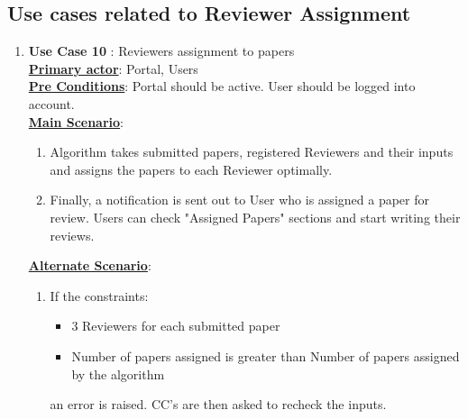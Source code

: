\documentclass[english,a4paper,12pt]{report}
\begin{document}
\subsection{Use cases related to Reviewer Assignment}
\begin{enumerate}
    \item \textbf{Use Case 10 }: Reviewers assignment to papers \\
\underline{\textbf{Primary actor}}: Portal, Users\\
\underline{\textbf{Pre Conditions}}: Portal should be active. User should be logged into account.\\
\underline{\textbf{Main Scenario}}:
\begin{enumerate}
    \item Algorithm takes submitted papers, registered Reviewers and their inputs and assigns the papers to each Reviewer optimally.
    \item Finally, a notification is sent out to User who is assigned a paper for review. Users can check "Assigned Papers" sections and start writing their reviews.
\end{enumerate}
\underline{\textbf{Alternate Scenario}}:
\begin{enumerate}
    \item If the constraints:
\begin{itemize}
    \item 3 Reviewers for each submitted paper
    \item Number of papers assigned is greater than Number of papers assigned by the algorithm
\end{itemize}
an error is raised. CC's are then asked to recheck the inputs.
\end{enumerate}
\end{enumerate}
\end{document}
